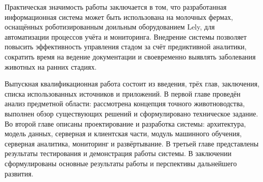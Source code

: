 Практическая значимость работы заключается в том, что разработанная информационная система может быть использована на молочных фермах, оснащённых роботизированным доильным оборудованием Lely, для автоматизации процессов учёта и мониторинга. Внедрение системы позволяет повысить эффективность управления стадом за счёт предиктивной аналитики, сократить время на ведение документации и своевременно выявлять заболевания животных на ранних стадиях.

Выпускная квалификационная работа состоит из введения, трёх глав, заключения, списка использованных источников и приложений. В первой главе проведён анализ предметной области: рассмотрена концепция точного животноводства, выполнен обзор существующих решений и сформулировано техническое задание. Во второй главе описаны проектирование и разработка системы: архитектура, модель данных, серверная и клиентская части, модуль машинного обучения, серверная аналитика, мониторинг и развёртывание. В третьей главе представлены результаты тестирования и демонстрация работы системы. В заключении сформулированы основные результаты работы и перспективы дальнейшего развития.
